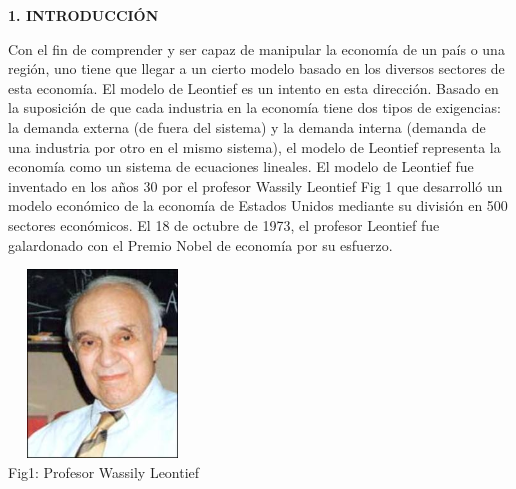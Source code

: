 \documentclass[10pt,a4paper]{article}
\begin{document}
\begin{multicols}{2}
\begin{center}
{\large \bf 1. INTRODUCCI\'ON}
\end{center}
 Con el fin de comprender y ser capaz de manipular la economía de un país o una región, uno tiene que llegar a un cierto modelo basado en los diversos sectores de esta economía. El modelo de Leontief es un intento en esta dirección. Basado en la suposición de que cada industria en la economía tiene dos tipos de exigencias: la demanda externa (de fuera del sistema) y la demanda interna (demanda de una industria por otro en el mismo sistema), el modelo de Leontief representa la economía como un sistema de ecuaciones lineales. El modelo de Leontief fue inventado en los años 30 por el profesor Wassily Leontief \color{blue} Fig 1 \color{black} que desarrolló un modelo económico de la economía de Estados Unidos mediante su división en 500 sectores económicos. El 18 de octubre de 1973, el profesor Leontief fue galardonado con el Premio Nobel de economía por su esfuerzo.\\
 
\begin{center}
	\centering
	\includegraphics[width=5cm,height=5cm]{leontief.jpg}
	\\
	Fig1: Profesor Wassily Leontief
\end{center}


\end{multicols}
\end{document}
